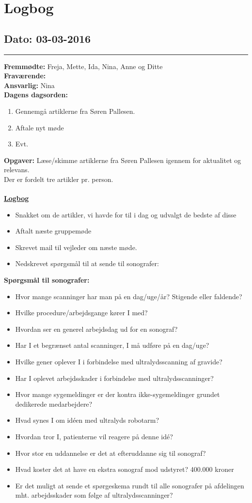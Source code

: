 \chapter{Logbog}
\section{Dato: 03-03-2016}
\hrule
\textbf{Fremmødte:} Freja, Mette, Ida, Nina, Anne og Ditte \\
\textbf{Fraværende: } \\
\textbf{Ansvarlig: }Nina  \\
\textbf{Dagens dagsorden: }
\begin{enumerate}
	\item Gennemgå artiklerne fra Søren Pallesen.
	\item Aftale nyt møde
	\item Evt. 
\end{enumerate}

\textbf{Opgaver:} \newline
Læse/skimme artiklerne fra Søren Pallesen igennem for aktualitet og relevans. \\
Der er fordelt tre artikler pr. person.\\\\
\underline{\textbf{Logbog}}
\begin{itemize}
\item Snakket om de artikler, vi havde for til i dag og udvalgt de bedste af disse
\item Aftalt næste gruppemøde
\item Skrevet mail til vejleder om næste møde.
\item Nedskrevet spørgsmål til at sende til sonografer:
\end{itemize}
\textbf{Spørgsmål til sonografer:}
\begin{itemize}
\item Hvor mange scanninger har man på en dag/uge/år? Stigende eller faldende?
\item Hvilke procedure/arbejdsgange kører I med?
\item Hvordan ser en generel arbejdsdag ud for en sonograf?
\item Har I et begrænset antal scanninger, I må udføre på en dag/uge?
\item Hvilke gener oplever I i forbindelse med ultralydsscanning af gravide?
\item Har I oplevet arbejdsskader i forbindelse med ultralydsscanninger?
\item Hvor mange sygemeldinger er der kontra ikke-sygemeldinger grundet dedikerede medarbejdere?
\item Hvad synes I om idéen med ultralyds robotarm?
\item Hvordan tror I, patienterne vil reagere på denne idé?
\item Hvor stor en uddannelse er det at efteruddanne sig til sonograf?
\item Hvad koster det at have en ekstra sonograf mod udstyret?
400.000 kroner
\item Er det muligt at sende et spørgeskema rundt til alle sonografer på afdelingen mht. arbejdsskader som følge af ultralydsscanninger?
\end{itemize}
